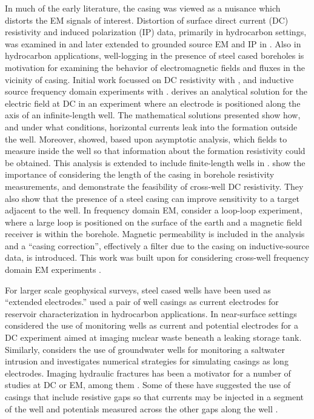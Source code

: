 In much of the early literature, the casing was viewed as a nuisance which distorts the EM signals of interest. Distortion of surface direct current (DC) resistivity and induced polarization (IP) data, primarily in hydrocarbon settings, was examined in \citep{Wait1983, Holladay1984, Johnston1987} and later extended to grounded source EM and IP in \citep{Wait1985, Williams1985, Johnston1992}. Also in hydrocarbon applications, well-logging in the presence of steel cased boreholes is motivation for examining the behavior of electromagnetic fields and fluxes in the vicinity of casing. Initial work focussed on DC resistivity with \citep{Kaufman1990, Schenkel1990, Kaufman1993, Schenkel1994}, and inductive source frequency domain experiments with \citep{Augustin1989}. \cite{Kaufman1990} derives an analytical solution for the electric field at DC in an experiment where an electrode is positioned along the axis of an infinite-length well. The mathematical solutions presented show how, and under what conditions, horizontal currents leak into the formation outside the well. Moreover, \cite{Kaufman1990} showed, based upon asymptotic analysis, which fields to measure inside the well so that information about the formation resistivity could be obtained. This analysis is extended to include finite-length wells in \cite{Kaufman1993}. \cite{Schenkel1994} show the importance of considering the length of the casing in borehole resistivity measurements, and demonstrate the feasibility of cross-well DC resistivity. They also show that the presence of a steel casing can improve sensitivity to a target adjacent to the well. In frequency domain EM, \cite{Augustin1989} consider a loop-loop experiment, where a large loop is positioned on the surface of the earth and a magnetic field receiver is within the borehole. Magnetic permeability is included in the analysis and a ``casing correction'', effectively a filter due to the casing on inductive-source data, is introduced. This work was built upon for considering cross-well frequency domain EM experiments \citep{Uchida1991, Wilt1996}.

For larger scale geophysical surveys, steel cased wells have been used as ``extended electrodes.'' \cite{Rocroi1985} used a pair of well casings as current electrodes for reservoir characterization in hydrocarbon applications. In near-surface settings \citep{Ramirez1996, Rucker2010, Rucker2012} considered the use of monitoring wells as current and potential electrodes for a DC experiment aimed at imaging nuclear waste beneath a leaking storage tank. Similarly, \cite{Ronczka2015} considers the use of groundwater wells for monitoring a saltwater intrusion and investigates numerical strategies for simulating casings as long electrodes. Imaging hydraulic fractures has been a motivator for a number of studies at DC or EM, among them \cite{Weiss2016, hoversten2017borehole}. Some of these have suggested the use of casings that include resistive gaps so that currents may be injected in a segment of the well and potentials measured across the other gaps along the well \citep{Nekut1995, Zhang2018}.

